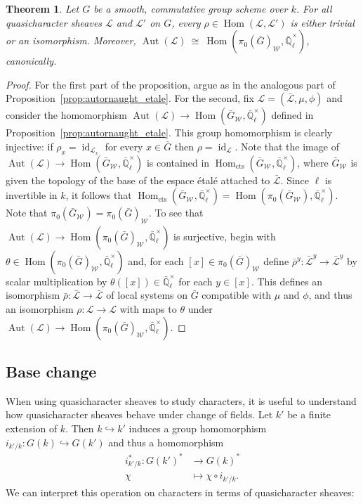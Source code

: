 \documentclass{amsart}
\theoremstyle{plain}
\newtheorem{theorem}{Theorem}[section]
\theoremstyle{definition}
\theoremstyle{remark}
\newcommand{\EE}{\mathbb{\bar Q}_\ell}
\newcommand{\Fq}{k}
\newcommand{\EEx}{\EE^\times}
\newcommand{\Weil}[1]{\mathcal{W}_{#1}}
\DeclareMathOperator{\Aut}{Aut}
\DeclareMathOperator{\Hom}{Hom}
\DeclareMathOperator{\id}{id}
\newcommand{\iso}{{\ \cong\ }}
\newcommand{\qcs}[1]{{\mathcal{#1}}}
\newcommand{\gqcs}[1]{{\mathcal{\bar #1}}}
\newcommand{\bG}{\bar{G}}
\begin{document}
\begin{theorem}\label{thm:autornaught}
Let $G$ be a smooth, commutative group scheme over $\Fq$.
For all quasicharacter sheaves $\qcs{L}$ and $\qcs{L}'$ on $G$,
every $\rho \in \Hom(\qcs{L},\qcs{L}')$ is either trivial or an isomorphism.
Moreover, $\Aut(\qcs{L}) \iso \Hom(\pi_0(\bG)_{\Weil{}},\EEx)$, canonically.
\end{theorem}
\begin{proof} 
For the first part of the proposition, argue as in the analogous part of Proposition~\ref{prop:autornaught_etale}.
For the second, fix $\qcs{L} = (\gqcs{L},\mu,\phi)$ and consider the homomorphism $\Aut(\qcs{L}) \to \Hom(\bG_{\Weil{}},\EEx)$ defined in Proposition~\ref{prop:autornaught_etale}.
This group homomorphism is clearly injective: if $\rho_x = \id_{\qcs{L}_x}$ for every $x\in \bG$ then $\rho = \id_{\qcs{L}}$.
Note that the image of $\Aut(\qcs{L}) \to \Hom(\bG_{\Weil{}},\EEx)$ is contained in $\Hom_\text{cts}(\bG_{\Weil{}},\EEx)$, where $\bG_{\Weil{}}$ is given the topology of the base of the espace étalé attached to $\gqcs{L}$.
Since $\ell$ is invertible in $\Fq$, it follows that $\Hom_\text{cts}(\bG_{\Weil{}},\EEx) = \Hom(\pi_0(\bG_{\Weil{}}),\EEx)$. 
Note that $\pi_0(\bG_{\Weil{}})=\pi_0(\bG)_{\Weil{}}$. 
To see that $\Aut(\qcs{L}) \to \Hom(\pi_0(\bG)_{\Weil{}},\EEx)$ is surjective, begin with $\theta\in\Hom(\pi_0(\bG)_{\Weil{}},\EEx)$ and, for each $[x] \in \pi_0(\bG)_{\Weil{}}$ define $\bar\rho^y: \gqcs{L}^y \to \gqcs{L}^y$ by scalar multiplication by $\theta([x])\in \EEx$ for each $y\in [x]$.
This defines an isomorphism $\bar\rho : \gqcs{L}\to \gqcs{L}$ of local systems on $\bG$ compatible with $\mu$ and $\phi$, and thus an isomorphism $\rho :\qcs{L}\to \qcs{L}$ with maps to $\theta$ under $\Aut(\qcs{L}) \to \Hom(\pi_0(\bG)_{\Weil{}},\EEx)$.
\end{proof}





\subsection{Base change}\label{sec:basechange}

When using quasicharacter sheaves to study characters, it is useful to understand
how quasicharacter sheaves behave under change of fields.
Let $k'$ be a finite extension of $k$. Then $k \hookrightarrow k'$ induces a group homomorphism
$i_{k'/k} : G(k) \hookrightarrow G(k')$ and thus a homomorphism
\begin{align*}
i_{k'/k}^* : G(k')^* &\to G(k)^* \\
\chi &\mapsto \chi\circ i_{k'/k}.
\end{align*}
We can interpret this operation on characters in terms of quasicharacter sheaves:
\end{document}
